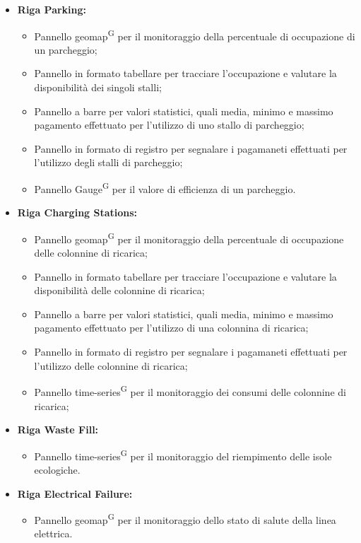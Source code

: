 \documentclass[8pt]{article}
\newcommand{\glossterm}[1]{#1\textsuperscript{G}} %
\begin{document}
\begin{itemize}
    \item \textbf{Riga Parking:}
    \begin{itemize}
        \item Pannello \glossterm{geomap} per il monitoraggio della percentuale di occupazione di un parcheggio;
        \item Pannello in formato tabellare per tracciare l'occupazione e valutare la disponibilità dei singoli stalli;
        \item Pannello a barre per valori statistici, quali media, minimo e massimo pagamento effettuato per l'utilizzo di uno stallo di parcheggio;
        \item Pannello in formato di registro per segnalare i pagamaneti effettuati per l'utilizzo degli stalli di parcheggio;
        \item Pannello \glossterm{Gauge} per il valore di efficienza di un parcheggio.
    \end{itemize}
    \item \textbf{Riga Charging Stations:}
    \begin{itemize}
        \item Pannello \glossterm{geomap} per il monitoraggio della percentuale di occupazione delle colonnine di ricarica;
        \item Pannello in formato tabellare per tracciare l'occupazione e valutare la disponibilità delle colonnine di ricarica;
        \item Pannello a barre per valori statistici, quali media, minimo e massimo pagamento effettuato per l'utilizzo di una colonnina di ricarica;
        \item Pannello in formato di registro per segnalare i pagamaneti effettuati per l'utilizzo delle colonnine di ricarica;
        \item Pannello \glossterm{time-series} per il monitoraggio dei consumi delle colonnine di ricarica;
    \end{itemize}
    \item \textbf{Riga Waste Fill:}
    \begin{itemize}
        \item Pannello \glossterm{time-series} per il monitoraggio del riempimento delle isole ecologiche.
    \end{itemize}
    \item \textbf{Riga Electrical Failure:}
    \begin{itemize}
        \item Pannello \glossterm{geomap} per il monitoraggio dello stato di salute della linea elettrica.
    \end{itemize}
\end{itemize}
\end{document}
